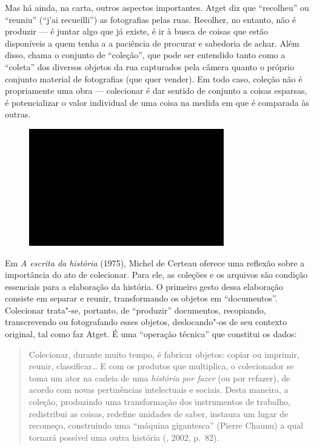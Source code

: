 Mas há ainda, na carta, outros aspectos importantes. Atget diz que
``recolheu'' ou ``reuniu'' (``j'ai recueilli'') as fotografias pelas
ruas. Recolher, no entanto, não é produzir --- é juntar algo que já
existe, é ir à busca de coisas que estão disponíveis a quem tenha a a
paciência de procurar e sabedoria de achar. Além disso, chama o conjunto
de ``coleção'', que pode ser entendido tanto como a ``coleta'' dos
diversos objetos da rua capturados pela câmera quanto o próprio conjunto
material de fotografias (que quer vender). Em todo caso, coleção não é
propriamente uma obra --- colecionar é dar sentido de conjunto a coisas
esparsas, é potencializar o valor individual de uma coisa na medida em
que é comparada às outras.

\begin{figure}[!ht]
\centering
 \includegraphics[width=85mm]{./imgs/im1.jpg}
\caption{\tiny{}}
\end{figure}

Em \emph{A escrita da história} (1975), Michel de Certeau oferece uma
reflexão sobre a importância do ato de colecionar. Para ele, as coleções
e os arquivos são condição essenciais para a elaboração da história. O
primeiro gesto dessa elaboração consiste em separar e reunir,
transformando os objetos em ``documentos''. Colecionar trata"-se,
portanto, de ``produzir'' documentos, recopiando, transcrevendo ou
fotografando esses objetos, deslocando"-os de seu contexto original, tal
como faz Atget. É uma ``operação técnica'' que constitui os dados:

\begin{quote}
Colecionar, durante muito tempo, é fabricar objetos: copiar ou imprimir,
reunir, classificar\ldots{} E com os produtos que multiplica, o colecionador
se toma um ator na cadeia de uma \emph{história por fazer} (ou por
refazer), de acordo com novas pertinências intelectuais e sociais. Desta
maneira, a coleção, produzindo uma transformação dos instrumentos de
trabalho, redistribui as coisas, redefine unidades de saber, instaura um
lugar de recomeço, construindo uma ``máquina gigantesca'' (Pierre
Chaunu) a qual tornará possível uma outra história (, 2002,
p.~82).
\end{quote}

